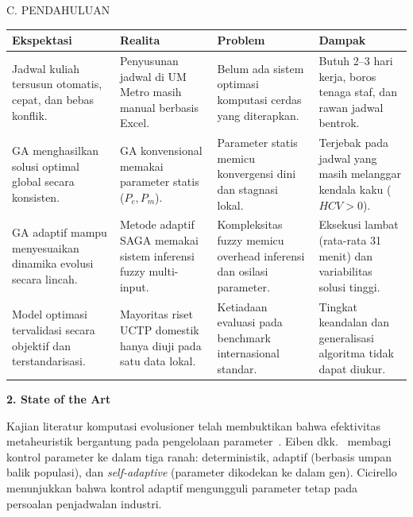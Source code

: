 \documentclass[letterpaper,12pt,oneside]{article}
\newcommand{\subheading}[2]{%
  \par\vspace{0.8em}\noindent
  \textbf{#1. #2}\par\vspace{0.3em}
}
\begin{document}
\begin{wordsection}{C. PENDAHULUAN}
\begin{center}
\label{tab:harapan_realita}
\small
\begin{tabularx}{\linewidth}{>{\RaggedRight\arraybackslash}p{3.5cm} >{\RaggedRight\arraybackslash}X >{\RaggedRight\arraybackslash}X >{\RaggedRight\arraybackslash}X}
\toprule
\textbf{Ekspektasi} & \textbf{Realita} & \textbf{Problem} & \textbf{Dampak} \\
\midrule
Jadwal kuliah tersusun otomatis, cepat, dan bebas konflik. & Penyusunan jadwal di UM Metro masih manual berbasis Excel. & Belum ada sistem optimasi komputasi cerdas yang diterapkan. & Butuh 2--3 hari kerja, boros tenaga staf, dan rawan jadwal bentrok. \\[0.4em]
GA menghasilkan solusi optimal global secara konsisten. & GA konvensional memakai parameter statis ($P_c, P_m$). & Parameter statis memicu konvergensi dini dan stagnasi lokal. & Terjebak pada jadwal yang masih melanggar kendala kaku ($HCV > 0$). \\[0.4em]
GA adaptif mampu menyesuaikan dinamika evolusi secara lincah. & Metode adaptif SAGA memakai sistem inferensi fuzzy multi-input. & Kompleksitas fuzzy memicu overhead inferensi dan osilasi parameter. & Eksekusi lambat (rata-rata 31 menit) dan variabilitas solusi tinggi. \\[0.4em]
Model optimasi tervalidasi secara objektif dan terstandarisasi. & Mayoritas riset UCTP domestik hanya diuji pada satu data lokal. & Ketiadaan evaluasi pada benchmark internasional standar. & Tingkat keandalan dan generalisasi algoritma tidak dapat diukur. \\
\bottomrule
\end{tabularx}
\end{center}

\subheading{2}{State of the Art}

Kajian literatur komputasi evolusioner telah membuktikan bahwa efektivitas metaheuristik bergantung pada pengelolaan parameter~\cite{eiben1999parameter,karafotias2015parameter,lacerda2021systematic}. Eiben dkk.~\cite{eiben1999parameter} membagi kontrol parameter ke dalam tiga ranah: deterministik, adaptif (berbasis umpan balik populasi), dan \textit{self-adaptive} (parameter dikodekan ke dalam gen). Cicirello~\cite{cicirello2016genetic} menunjukkan bahwa kontrol adaptif mengungguli parameter tetap pada persoalan penjadwalan industri.


\end{wordsection}
\end{document}
